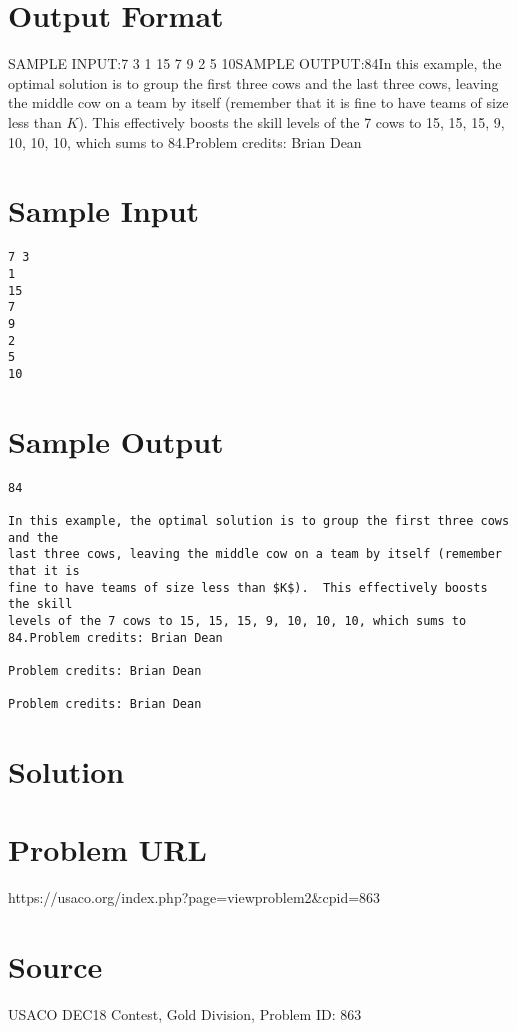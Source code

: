 \documentclass[12pt]{article}
\begin{document}
\section*{Output Format}
SAMPLE INPUT:7 3
1
15
7
9
2
5
10SAMPLE OUTPUT:84In this example, the optimal solution is to group the first three cows and the
last three cows, leaving the middle cow on a team by itself (remember that it is
fine to have teams of size less than $K$).  This effectively boosts the skill
levels of the 7 cows to 15, 15, 15, 9, 10, 10, 10, which sums to 84.Problem credits: Brian Dean

\section*{Sample Input}
\begin{verbatim}
7 3
1
15
7
9
2
5
10
\end{verbatim}

\section*{Sample Output}
\begin{verbatim}
84

In this example, the optimal solution is to group the first three cows and the
last three cows, leaving the middle cow on a team by itself (remember that it is
fine to have teams of size less than $K$).  This effectively boosts the skill
levels of the 7 cows to 15, 15, 15, 9, 10, 10, 10, which sums to 84.Problem credits: Brian Dean

Problem credits: Brian Dean

Problem credits: Brian Dean
\end{verbatim}

\section*{Solution}


\section*{Problem URL}
https://usaco.org/index.php?page=viewproblem2&cpid=863

\section*{Source}
USACO DEC18 Contest, Gold Division, Problem ID: 863
\end{document}
